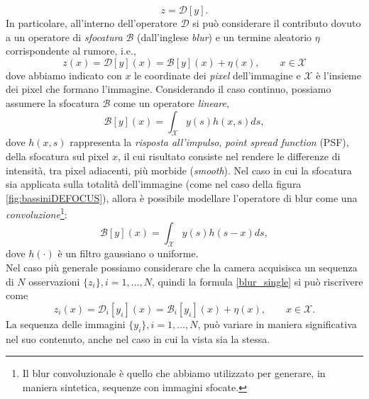 \begin{equation}
z=\mathcal{D}[y].
\end{equation}
In particolare, all'interno dell'operatore $\mathcal{D}$ si pu\`o considerare il contributo dovuto a un operatore di \textit{sfocatura} $\mathcal{B}$ (dall'inglese \textit{blur}) e un termine aleatorio $\eta$ corrispondente al rumore, i.e.,
\begin{equation}
\label{blur_single}
z(x)=\mathcal{D}[y](x) = \mathcal{B}[y](x) + \eta(x), \qquad x \in \mathcal{X}
\end{equation}
dove abbiamo indicato con $x$ le coordinate dei \textit{pixel} dell'immagine e $\mathcal{X}$ \`e l'insieme dei pixel che formano l'immagine. 
Considerando il caso continuo, possiamo assumere la sfocatura $\mathcal{B}$ come un operatore \textit{lineare},
\begin{equation}
\label{eq:blur}
\mathcal{B}[y](x) = \int_{\mathcal{X}}y(s)h(x,s)ds,
\end{equation}
dove $h(x,s)$ rappresenta la \textit{risposta all'impulso}, \textit{point spread function} (PSF), della sfocatura sul pixel $x$, il cui risultato consiste nel rendere le differenze di intensit\`a, tra pixel adiacenti, pi\`u morbide (\textit{smooth}).
Nel caso in cui la sfocatura sia applicata sulla totalit\`a dell'immagine (come nel caso della figura \ref{fig:bassiniDEFOCUS}), allora \`e possibile modellare l'operatore di blur come una \textit{convoluzione}\footnote{Il blur convoluzionale \`e quello che abbiamo utilizzato per generare, in maniera sintetica, sequenze con immagini sfocate.}:
\begin{equation}
\label{blur_convolution}
\mathcal{B}[y](x) = \int_{\mathcal{X}}y(s)h(s-x)ds,
\end{equation}
dove $h(\cdot)$ \`e un filtro gaussiano o uniforme.\\
Nel caso pi\`u generale possiamo considerare che la camera acquisisca un sequenza di $N$ osservazioni $\{z_i\}, i = 1, \dots ,N$, quindi la formula \eqref{blur_single} si pu\`o riscrivere come
\begin{equation}
\label{blur_multi}
z_i(x)=\mathcal{D}_i[y_i](x) = \mathcal{B}_i[y_i](x) + \eta(x), \qquad x \in \mathcal{X}.
\end{equation}
La sequenza delle immagini $\{y_i\}, i = 1,\dots , N$, pu\`o variare in maniera significativa nel suo contenuto, anche nel caso in cui la vista sia la stessa.
